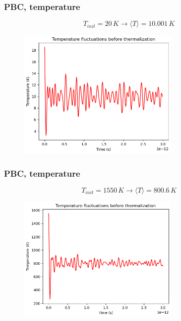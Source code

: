 \documentclass{beamer}
\begin{document}
\begin{frame}
    \frametitle{PBC, temperature}

    $$T_{init}=20\,K \rightarrow \langle T \rangle =10.001    \,K $$

    \begin{figure}
        \includegraphics[width=0.7\textwidth]{images/temp5.png}
    \end{figure}

\end{frame}


\begin{frame}
    \frametitle{PBC, temperature}

    $$T_{init}=1550\,K \rightarrow \langle T \rangle =  800.6    \,K $$

    \begin{figure}
        \includegraphics[width=0.7\textwidth]{images/temp5800k.png}
    \end{figure}

\end{frame}
\end{document}
